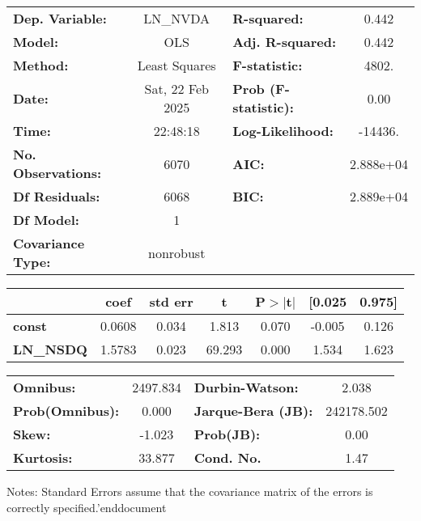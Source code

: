 \documentclass{report}
\begin{document}
\begin{center}
\begin{tabular}{lclc}
\toprule
\textbf{Dep. Variable:}    &     LN\_NVDA     & \textbf{  R-squared:         } &     0.442   \\
\textbf{Model:}            &       OLS        & \textbf{  Adj. R-squared:    } &     0.442   \\
\textbf{Method:}           &  Least Squares   & \textbf{  F-statistic:       } &     4802.   \\
\textbf{Date:}             & Sat, 22 Feb 2025 & \textbf{  Prob (F-statistic):} &     0.00    \\
\textbf{Time:}             &     22:48:18     & \textbf{  Log-Likelihood:    } &   -14436.   \\
\textbf{No. Observations:} &        6070      & \textbf{  AIC:               } & 2.888e+04   \\
\textbf{Df Residuals:}     &        6068      & \textbf{  BIC:               } & 2.889e+04   \\
\textbf{Df Model:}         &           1      & \textbf{                     } &             \\
\textbf{Covariance Type:}  &    nonrobust     & \textbf{                     } &             \\
\bottomrule
\end{tabular}
\begin{tabular}{lcccccc}
                  & \textbf{coef} & \textbf{std err} & \textbf{t} & \textbf{P$> |$t$|$} & \textbf{[0.025} & \textbf{0.975]}  \\
\midrule
\textbf{const}    &       0.0608  &        0.034     &     1.813  &         0.070        &       -0.005    &        0.126     \\
\textbf{LN\_NSDQ} &       1.5783  &        0.023     &    69.293  &         0.000        &        1.534    &        1.623     \\
\bottomrule
\end{tabular}
\begin{tabular}{lclc}
\textbf{Omnibus:}       & 2497.834 & \textbf{  Durbin-Watson:     } &     2.038   \\
\textbf{Prob(Omnibus):} &   0.000  & \textbf{  Jarque-Bera (JB):  } & 242178.502  \\
\textbf{Skew:}          &  -1.023  & \textbf{  Prob(JB):          } &      0.00   \\
\textbf{Kurtosis:}      &  33.877  & \textbf{  Cond. No.          } &      1.47   \\
\bottomrule
\end{tabular}
\end{center}

Notes: \newline
 [1] Standard Errors assume that the covariance matrix of the errors is correctly specified.'end{document}
\end{document}
